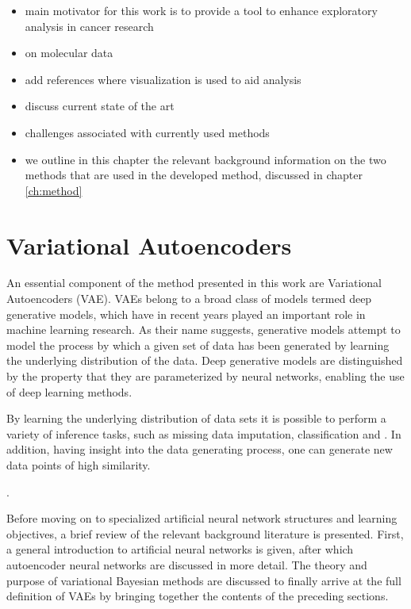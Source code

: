
\begin{itemize}
\item main motivator for this work is to provide a tool to enhance exploratory analysis in cancer research
\item on molecular data
\item add references where visualization is used to aid analysis
\item discuss current state of the art
\item challenges associated with currently used methods
\item we outline in this chapter the relevant background information on the two methods that are used in the developed method, discussed in chapter \ref{ch:method}
\end{itemize}

\section{Variational Autoencoders}
\label{section:variational_autoencoders}

An essential component of the method presented in this work are Variational Autoencoders (VAE). VAEs belong to a broad class of models termed deep generative models, which have in recent years played an important role in machine learning research. As their name suggests, generative models attempt to model the process by which a given set of data has been generated by learning the underlying distribution of the data. Deep generative models are distinguished by the property that they are parameterized by neural networks, enabling the use of deep learning methods.

By learning the underlying distribution of data sets it is possible to perform a variety of inference tasks, such as missing data imputation, classification and . In addition, having insight into the data generating process, one can generate new data points of high similarity.

 \cite{boltzmann_machines, deep_boltzmann_machines, deep_belief_nets, hinton_deep_belief_nets, gan}.


Before moving on to specialized artificial neural network structures and learning objectives, a brief review of the relevant background literature is presented. First, a general introduction to artificial neural networks is given, after which autoencoder neural networks are discussed in more detail. The theory and purpose of variational Bayesian methods are discussed to finally arrive at the full definition of VAEs by bringing together the contents of the preceding sections.

